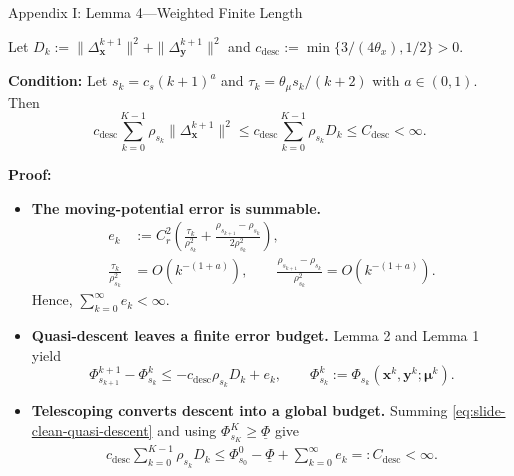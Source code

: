 \documentclass[handout,compress,9pt]{beamer}
\newcommand{\blue}[1]{\textcolor{ddlblue}{#1}}
\newcommand{\bx}{\bm{x}}
\newcommand{\by}{\bm{y}}
\newcommand{\bmu}{\bm{\mu}}
\begin{document}
\begin{frame}{Appendix I: Lemma 4---Weighted Finite Length
\hfill\hyperlink{appendix:contents}{}}
\scriptsize

Let
$D_k:=\|\Delta_{\bx}^{k+1}\|^2+\|\Delta_{\by}^{k+1}\|^2$ and
$c_{\mathrm{desc}}:=\min\{3/(4\theta_x),1/2\}>0$.

\noindent\textbf{Condition:} Let $s_k=c_s(k+1)^a$ and
$\tau_k=\theta_\mu s_k/(k+2)$ with $a\in(0,1)$. Then
\begin{equation}\label{eq:slide-weighted-finite-length}
  c_{\mathrm{desc}}\sum_{k=0}^{K-1}
  \rho_{s_k}\|\Delta_{\bx}^{k+1}\|^2
  \le c_{\mathrm{desc}}\sum_{k=0}^{K-1}\rho_{s_k}D_k
  \le C_{\mathrm{desc}}<\infty.
\end{equation}

\noindent\textbf{Proof:}
\begin{itemize}
\setlength{\itemsep}{0.06cm}
\item[\blue{$\triangleright$}]
\textbf{The moving-potential error is summable.}
\begin{equation*}
\begin{aligned}
  e_k
  &:=C_r^2\left(
  \frac{\tau_k}{\rho_{s_k}^2}
  +\frac{\rho_{s_{k+1}}-\rho_{s_k}}{2\rho_{s_k}^2}
  \right),\\
  \frac{\tau_k}{\rho_{s_k}^2}
  &=O(k^{-(1+a)}),
  \qquad
  \frac{\rho_{s_{k+1}}-\rho_{s_k}}{\rho_{s_k}^2}
  =O(k^{-(1+a)}).
\end{aligned}
\end{equation*}
Hence, $\sum_{k=0}^{\infty}e_k<\infty$.

\item[\blue{$\triangleright$}]
\textbf{Quasi-descent leaves a finite error budget.}
Lemma 2 and Lemma 1 yield
\begin{equation}\label{eq:slide-clean-quasi-descent}
  \Phi_{s_{k+1}}^{k+1}-\Phi_{s_k}^{k}
  \le -c_{\mathrm{desc}}\rho_{s_k}D_k+e_k,
  \qquad
  \Phi_{s_k}^{k}:=\Phi_{s_k}(\bx^k,\by^k;\bmu^k).
\end{equation}

\item[\blue{$\triangleright$}]
\textbf{Telescoping converts descent into a global budget.}
Summing \eqref{eq:slide-clean-quasi-descent} and using 
$\Phi_{s_K}^{K}\ge\underline\Phi$ give
\begin{equation*}
\begin{aligned}
  c_{\mathrm{desc}}\sum_{k=0}^{K-1}\rho_{s_k}D_k
  \le \Phi_{s_0}^{0}-\underline\Phi
  +\sum_{k=0}^{\infty}e_k
  =:C_{\mathrm{desc}}<\infty.
\end{aligned}
\end{equation*}
\end{itemize}
\end{frame}
\end{document}
